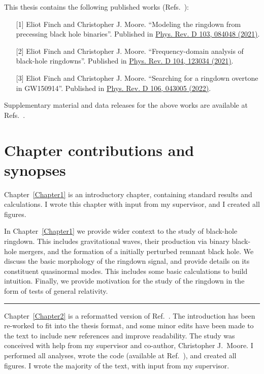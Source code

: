 \documentclass[
12pt, %
english, %
doublespacing, %
headsepline, %
]{MastersDoctoralThesis} %
\begin{document}
This thesis contains the following published works (Refs.~\cite{Finch:2021iip, Finch:2021qph, Finch:2022ynt}):
\begin{itemize}
\item[{[1]}] Eliot Finch and Christopher J. Moore. ``Modeling the ringdown from precessing black hole binaries''. Published in \href{https://journals.aps.org/prd/abstract/10.1103/PhysRevD.103.084048}{Phys. Rev. D 103, 084048 (2021)}.
\item[{[2]}] Eliot Finch and Christopher J. Moore. ``Frequency-domain analysis of black-hole
ringdowns''. Published in \href{https://journals.aps.org/prd/abstract/10.1103/PhysRevD.104.123034}{Phys. Rev. D 104, 123034 (2021)}.
\item[{[3]}] Eliot Finch and Christopher J. Moore. ``Searching for a ringdown overtone in
GW150914''. Published in \href{https://journals.aps.org/prd/abstract/10.1103/PhysRevD.106.043005}{Phys. Rev. D 106, 043005 (2022)}.
\end{itemize}
Supplementary material and data releases for the above works are available at Refs.~\cite{finch_eliot_2021_4538194, finch_eliot_2021_5569759, finch_eliot_2022_6949492}.

\section*{Chapter contributions and synopses}

Chapter~\ref{Chapter1} is an introductory chapter, containing standard results and calculations. 
I wrote this chapter with input from my supervisor, and I created all figures. 

\vspace{0.2cm}

\noindent In Chapter~\ref{Chapter1} we provide wider context to the study of black-hole ringdown.
This includes gravitational waves, their production via binary black-hole mergers, and the formation of a initially perturbed remnant black hole.
We discuss the basic morphology of the ringdown signal, and provide details on its constituent quasinormal modes. 
This includes some basic calculations to build intuition.
Finally, we provide motivation for the study of the ringdown in the form of tests of general relativity. 

\begin{center}
    \rule[.5ex]{.5\textwidth}{.5pt}
\end{center}

\noindent Chapter~\ref{Chapter2} is a reformatted version of Ref.~\cite{Finch:2021iip}.
The introduction has been re-worked to fit into the thesis format, and some minor edits have been made to the text to include new references and improve readability. 
The study was conceived with help from my supervisor and co-author, Christopher J.\ Moore.
I performed all analyses, wrote the code (available at Ref.~\cite{qnmfits}), and created all figures.
I wrote the majority of the text, with input from my supervisor.
\end{document}
